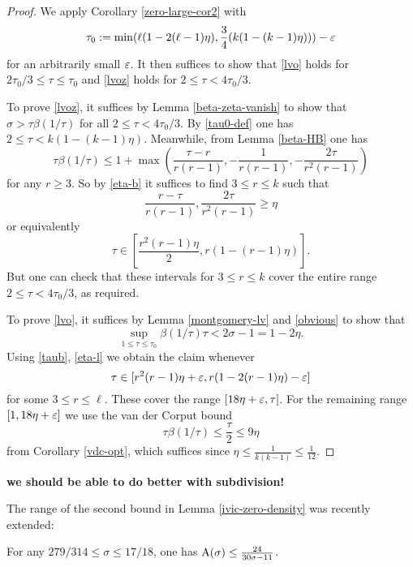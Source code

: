 \begin{proof} We apply Corollary \ref{zero-large-cor2} with
\begin{equation}\label{tau0-def}
\tau_0 := \min( \ell (1 - 2(\ell-1) \eta), \frac{3}{4} (k(1-(k-1)\eta)) ) - \varepsilon
\end{equation}
for an arbitrarily small $\varepsilon$.
It then suffices to show that \eqref{lvo} holds for $2\tau_0/3 \leq \tau \leq \tau_0$ and \eqref{lvoz} holds for $2 \leq \tau < 4\tau_0/3$.

To prove \eqref{lvoz}, it suffices by Lemma \ref{beta-zeta-vanish} to show that $\sigma > \tau \beta(1/\tau)$ for all $2 \leq \tau < 4 \tau_0/3$.  By \eqref{tau0-def} one has $2 \leq \tau < k(1-(k-1)\eta)$.  Meanwhile, from Lemma \ref{beta-HB} one has
\begin{equation}\label{taub}
\tau \beta(1/\tau) \leq 1 + \max\left( \frac{\tau-r}{r(r-1)}, -\frac{1}{r(r-1)}, - \frac{2\tau}{r^2(r-1)}\right)
\end{equation}
for any $r \geq 3$.  So by \eqref{eta-b} it suffices to find $3 \leq r \leq k$ such that
$$ \frac{r-\tau}{r(r-1)}, \frac{2\tau}{r^2(r-1)} \geq \eta$$
or equivalently
$$ \tau \in [\frac{r^2(r-1)\eta}{2}, r(1-(r-1)\eta)].$$
But one can check that these intervals for $3 \leq r \leq k$ cover the entire range $2 \leq \tau < 4\tau_0/3$, as required.

To prove \eqref{lvo}, it suffices by Lemma \ref{montgomery-lv} and \eqref{obvious} to show that
$$ \sup_{1 \leq \tau \leq \tau_0} \beta(1/\tau) \tau < 2\sigma - 1 = 1 - 2 \eta.$$
Using \eqref{taub}, \eqref{eta-l} we obtain the claim whenever
$$ \tau \in [r^2(r-1)\eta+\varepsilon, r(1-2(r-1)\eta)-\varepsilon]$$
for some $3 \leq r \leq \ell$.  These cover the range $[18\eta+\varepsilon, \tau]$.  For the remaining range $[1, 18\eta+\varepsilon]$ we use the van der Corput bound
$$ \tau \beta(1/\tau) \leq \frac{\tau}{2} \leq 9 \eta$$
from Corollary \ref{vdc-opt}, which suffices since $\eta \leq \frac{1}{k(k-1)} \leq \frac{1}{12}$.
\end{proof}


{\bf we should be able to do better with subdivision!}

The range of the second bound in Lemma \ref{ivic-zero-density} was recently extended:

\begin{theorem}\label{cdv-density}\cite{chen_debruyne_vindas_density_2024}  For any $279/314 \leq \sigma \leq 17/18$, one has $\mathrm{A}(\sigma) \leq \frac{24}{30\sigma-11}$.
\end{theorem}

